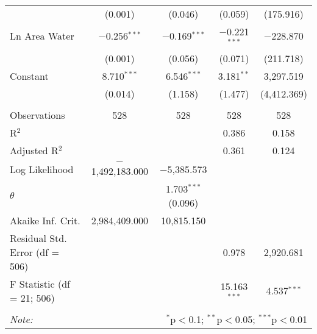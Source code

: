 \begin{table}[!htbp]
\begin{tabular}{@{\extracolsep{5pt}}lcccc}
  & (0.001) & (0.046) & (0.059) & (175.916) \\ 
  Ln Area Water & $-$0.256$^{***}$ & $-$0.169$^{***}$ & $-$0.221$^{***}$ & $-$228.870 \\ 
  & (0.001) & (0.056) & (0.071) & (211.718) \\ 
  Constant & 8.710$^{***}$ & 6.546$^{***}$ & 3.181$^{**}$ & 3,297.519 \\ 
  & (0.014) & (1.158) & (1.477) & (4,412.369) \\ 
 \hline \\[-1.8ex] 
Observations & 528 & 528 & 528 & 528 \\ 
R$^{2}$ &  &  & 0.386 & 0.158 \\ 
Adjusted R$^{2}$ &  &  & 0.361 & 0.124 \\ 
Log Likelihood & $-$1,492,183.000 & $-$5,385.573 &  &  \\ 
$\theta$ &  & 1.703$^{***}$  (0.096) &  &  \\ 
Akaike Inf. Crit. & 2,984,409.000 & 10,815.150 &  &  \\ 
Residual Std. Error (df = 506) &  &  & 0.978 & 2,920.681 \\ 
F Statistic (df = 21; 506) &  &  & 15.163$^{***}$ & 4.537$^{***}$ \\ 
\hline 
\hline \\[-1.8ex] 
\textit{Note:}  & \multicolumn{4}{r}{$^{*}$p$<$0.1; $^{**}$p$<$0.05; $^{***}$p$<$0.01} \\ 
\end{tabular} 
\end{table} 
